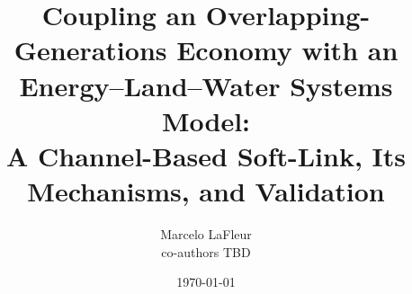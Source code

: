 \documentclass[11pt]{article}
\title{\bfseries Coupling an Overlapping-Generations Economy with an
Energy--Land--Water Systems Model:\\[2pt]
\large A Channel-Based Soft-Link, Its Mechanisms, and Validation}
\author{Marcelo LaFleur \\ \small co-authors TBD}
\date{\today}
\begin{document}
\maketitle

\begin{abstract}

\end{abstract}











\appendix




\end{document}
